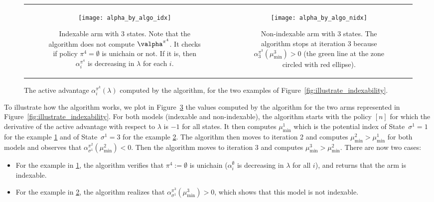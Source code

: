 \begin{figure}[ht!]
    \begin{tabular}{cc}
        \begin{subfigure}[t]{0.48\linewidth}
            \texttt{[image: alpha\_by\_algo\_idx]}
            \caption{Indexable arm with $3$ states. Note that the algorithm does not compute $\valpha^{\pi^4}$. It checks if policy $\pi^4=\emptyset$ is unichain or not. If it is, then $\alpha^{\pi^4}_i$ is decreasing in $\lambda$ for each $i$.}
            \label{fig:illustrate_algo_ind}
        \end{subfigure}
        &\begin{subfigure}[t]{0.48\linewidth}
            \texttt{[image: alpha\_by\_algo\_nidx]}
            \caption{Non-indexable arm with $3$ states. The algorithm stops at iteration $3$ because $\alpha^{\pi^3}_3(\mu^3_{\min})>0$ (the green line at the zone circled with red ellipse).}
            \label{fig:illustrate_algo_nind}
        \end{subfigure}            
    \end{tabular}
    \caption{
        The active advantage $\alpha^{\pi^k}_i(\lambda)$ computed by the algorithm, for the two examples of Figure~\ref{fig:illustrate_indexability}.
    }
    \label{fig:illustrate_algo}
\end{figure}


To illustrate how the algorithm works, we plot in Figure~\ref{fig:illustrate_algo} the values computed by the algorithm for the two arms represented in Figure~\ref{fig:illustrate_indexability}. For both models (indexable and non-indexable), the algorithm starts with the policy $[n]$ for which the derivative of the active advantage with respect to $\lambda$ is $-1$ for all states. It then computes $\mu^1_{\min}$ which is the potential index of State~$\sigma^1=1$ for the example \ref{fig:illustrate_algo_ind} and of State~$\sigma^1=3$ for the example \ref{fig:illustrate_algo_nind}. The algorithm then moves to iteration 2 and computes $\mu^2_{\min}>\mu^1_{\min}$ for both models and observes that $\alpha^{\pi^2}_{\sigma^1}(\mu^2_{\min})<0$. Then the algorithm moves to iteration $3$ and computes $\mu^3_{\min}>\mu^2_{\min}$. There are now two cases: 
\begin{itemize}
    \item For the example in \ref{fig:illustrate_algo_ind}, the algorithm verifies that $\pi^4:=\emptyset$ is unichain ($\alpha^{\emptyset}_i$ is decreasing in $\lambda$ for all $i$), and returns that the arm is indexable.
    \item For the example in \ref{fig:illustrate_algo_nind}, the algorithm realizes that $\alpha^{\pi^3}_{\sigma^1}(\mu^3_{\min})>0$, which shows that this model is not indexable. 
\end{itemize}

